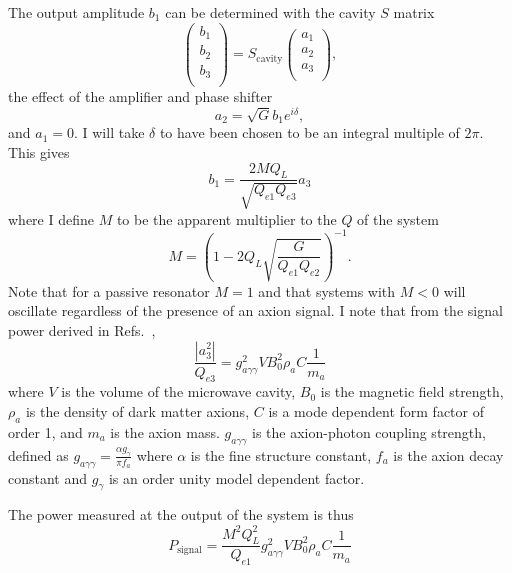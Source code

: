 \documentclass[aps,prl,twocolumn,groupedaddress]{revtex4-1}
\begin{document}
The output amplitude $b_1$ can be determined with the cavity $S$ matrix
\begin{equation}
\left(\begin{array}{c}
b_1\\
b_2\\
b_3\\
\end{array}\right)
=
S_{\mathrm{cavity}}\left(\begin{array}{c}
a_1\\
a_2\\
a_3\\
\end{array}\right),
\end{equation}
the effect of the amplifier and phase shifter
\begin{equation}
a_2=\sqrt{G}b_1e^{i\delta},
\end{equation}
and $a_1=0$.   I will take $\delta$ to have been chosen to be an integral multiple of $2\pi$.  This gives
\begin{equation}
b_1=\frac{2MQ_L}{\sqrt{Q_{e1}Q_{e3}}} a_3
\end{equation}
where I define $M$ to be the apparent multiplier to the $Q$ of the system
\begin{equation}
M=\left(1-2Q_L\sqrt{\frac{G}{Q_{e1}Q_{e2}}}\right)^{-1}.
\end{equation}
Note that for a passive resonator $M=1$ and that systems with $M<0$ will oscillate regardless of the presence of an axion signal. 
I note that from the signal power derived in Refs.~\cite{Cavity_idea_2,PhysRevLett.80.2043},
\begin{equation}
\frac{|a_3^2|}{Q_{e3}}=g_{a\gamma\gamma}^2VB_0^2\rho_aC\frac{1}{m_a}
\end{equation}
where $V$ is the volume of the microwave cavity, $B_0$ is the magnetic field strength, $\rho_a$ is the density of dark matter axions, $C$ is a mode dependent form factor of order 1, and $m_a$ is the axion mass.  
$g_{a\gamma\gamma}$ is the axion-photon coupling strength, defined as $g_{a\gamma\gamma}=\frac{\alpha g_\gamma}{\pi f_a}$ where $\alpha$ is the fine structure constant, $f_a$ is the axion decay constant and $g_\gamma$ is an order unity model dependent factor.

 The power measured at the output of the system is thus
\begin{equation}
\label{eqn:rawsig}
P_{\mathrm{signal}}=\frac{M^2Q_L^2}{Q_{e1}}g_{a\gamma\gamma}^2VB_0^2\rho_aC\frac{1}{m_a}
\end{equation}
\end{document}

